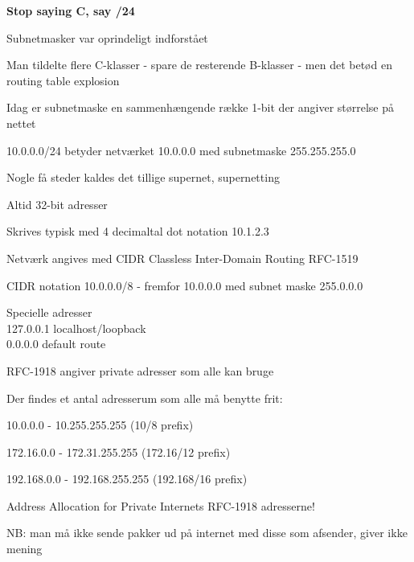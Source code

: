 \documentclass[Screen16to9,17pt]{foils}
\begin{document}
\vskip 5mm
\centerline{\bf Stop saying C, say /24}



\begin{list1}
\item Subnetmasker var oprindeligt indforstået
\item Man tildelte flere C-klasser - spare de resterende B-klasser - men det betød en routing table explosion
\item Idag er subnetmaske en sammenhængende række 1-bit der angiver størrelse på nettet
\item 10.0.0.0/24 betyder netværket 10.0.0.0 med subnetmaske 255.255.255.0
\item Nogle få steder kaldes det tillige supernet, supernetting
\end{list1}



\begin{list2}
\item Altid 32-bit adresser
\item Skrives typisk med 4 decimaltal dot notation 10.1.2.3
\item Netværk angives med CIDR Classless Inter-Domain Routing RFC-1519
\item CIDR notation 10.0.0.0/8 -
  fremfor 10.0.0.0 med subnet maske 255.0.0.0
\item Specielle adresser\\
127.0.0.1 localhost/loopback\\
0.0.0.0  default route
\item RFC-1918 angiver private adresser som alle kan bruge
\end{list2}


\begin{list1}
\item Der findes et antal adresserum som alle må benytte frit:
\begin{list2}
\item 10.0.0.0    -  10.255.255.255  (10/8 prefix)
\item 172.16.0.0  -  172.31.255.255  (172.16/12 prefix)
\item 192.168.0.0 -  192.168.255.255 (192.168/16 prefix)
\end{list2}
\item Address Allocation for Private Internets RFC-1918 adresserne!
\item NB: man må ikke sende pakker ud på internet med disse som afsender, giver ikke mening
\end{list1}
\end{document}
